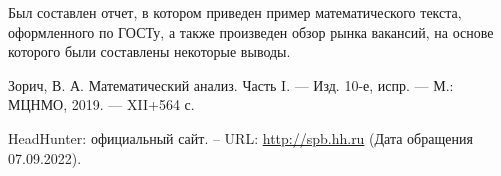 \documentclass[14pt]{extreport}
\begin{document}
\conclusions

Был составлен отчет, в котором приведен пример математического текста, оформленного по ГОСТу, а также произведен обзор рынка вакансий, на основе которого были составлены некоторые выводы.



\newpage
\begin{thebibliography}{99}
 Зорич, В. А. Математический анализ. Часть I. — Изд. 10-е, испр. — М.: МЦНМО, 2019. — XII+564 с.

 HeadHunter: официальный сайт. – URL: \url{http://spb.hh.ru} (Дата обращения 07.09.2022).
\end{thebibliography}
\end{document}
